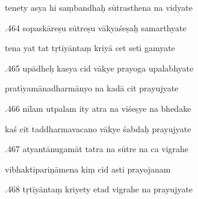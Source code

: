 \documentclass[article,12pt,a4paper]{memoir}%
\newcounter{parCount}
\begin{document}
	  
	  \pstart \leavevmode%
	tenety asya hi saṃbandhaḥ sūtrasthena na vidyate 
	{}
	\pend%
      

	  
	  \pstart {}.464 sopaskāreṣu sūtreṣu vākyaśeṣaḥ samarthyate 
	{}
	\pend%
      

	  
	  \pstart \leavevmode%
	tena yat tat tṛtīyāntaṃ kriyā cet seti gamyate 
	{}
	\pend%
      

	  
	  \pstart {}.465 upādheḥ kasya cid vākye prayoga upalabhyate 
	{}
	\pend%
      

	  
	  \pstart \leavevmode%
	pratīyamānadharmānyo na kadā cit prayujyate 
	{}
	\pend%
      

	  
	  \pstart {}.466 nīlam utpalam ity atra na viśeṣye na bhedake 
	{}
	\pend%
      

	  
	  \pstart \leavevmode%
	kaś cit taddharmavacano vākye śabdaḥ prayujyate 
	{}
	\pend%
      

	  
	  \pstart {}.467 atyantānugamāt tatra na sūtre na ca vigrahe 
	{}
	\pend%
      

	  
	  \pstart \leavevmode%
	vibhaktipariṇāmena kiṃ cid asti prayojanam 
	{}
	\pend%
      

	  
	  \pstart {}.468 tṛtīyāntaṃ kriyety etad vigrahe na prayujyate 
	{}
	\pend%
      
\end{document}
